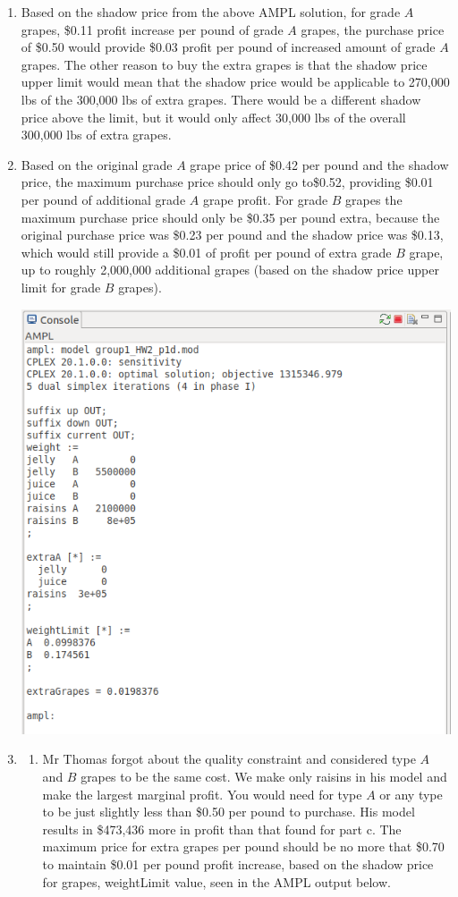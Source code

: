 \documentclass[11pt]{article}
\begin{document}
\begin{enumerate}
\begin{enumerate}
\item Based on the shadow price from the above AMPL solution, for grade $A$ grapes, \$0.11 profit increase per pound of grade $A$ grapes, the purchase price of \$0.50 would provide \$0.03 profit per pound of increased amount of grade $A$ grapes.  The other reason to buy the extra grapes is that the shadow price upper limit would mean that the shadow price would be applicable to 270,000 lbs of the 300,000 lbs of extra grapes.  There would be a different shadow price above the limit, but it would only affect 30,000 lbs of the overall 300,000 lbs of extra grapes. 
\item Based on the original grade $A$ grape price of \$0.42 per pound and the shadow price, the maximum purchase price should only go to\$0.52, providing \$0.01 per pound of additional grade $A$ grape profit.  For grade $B$ grapes the maximum purchase price should only be \$0.35 per pound extra, because the original purchase price was \$0.23 per pound and the shadow price was \$0.13, which would still provide a \$0.01 of profit per pound of extra grade $B$ grape, up to roughly 2,000,000 additional grapes (based on the shadow price upper limit for grade $B$ grapes).

\includegraphics[width=.9\textwidth]{outputp1db.png}

\item 
\begin{enumerate}
\item Mr Thomas forgot about the quality constraint and considered type $A$ and $B$ grapes to be the same cost.  We make only raisins in his model and make the largest marginal profit.  You would need for type $A$ or any type to be just slightly less than \$0.50 per pound to purchase.  His model results in \$473,436 more in profit than that found for part c.  The maximum price for extra grapes per pound should be no more that \$0.70 to maintain \$0.01 per pound profit increase, based on the shadow price for grapes, weightLimit value, seen in the AMPL output below. 


\end{enumerate}
\end{enumerate}
\end{enumerate}
\end{document}
